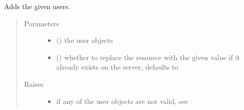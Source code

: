 \documentclass[letterpaper,10pt,english]{sphinxmanual}
\begin{document}
\begin{fulllineitems}
\begin{fulllineitems}
\label{\detokenize{autoapi/pine/client/client/index:pine.client.client.EveClient.add_users}}
\sphinxAtStartPar
Adds the given users.
\begin{quote}\begin{description}
\item[{Parameters}] \leavevmode\begin{itemize}
\item {} 
\sphinxAtStartPar
{} (\sphinxstyleliteralemphasis{\sphinxupquote{(}}\sphinxstyleliteralemphasis{\sphinxupquote{)}}) \textendash{} the user objects

\item {} 
\sphinxAtStartPar
{} (\sphinxstyleliteralemphasis{\sphinxupquote{, }}) \textendash{} whether to replace the resource with the given value if it already exists on the server, defaults to 

\end{itemize}

\item[{Raises}] \leavevmode\begin{itemize}
\item {} 
\sphinxAtStartPar
{\hyperref[\detokenize{autoapi/pine/client/exceptions/index:pine.client.exceptions.PineClientValueException}]{}} \textendash{} if any of the user objects are not valid, see {\hyperref[\detokenize{autoapi/pine/client/models/index:pine.client.models.is_valid_eve_user}]{}}


\end{itemize}
\end{description}
\end{quote}
\end{fulllineitems}
\end{fulllineitems}
\end{document}
